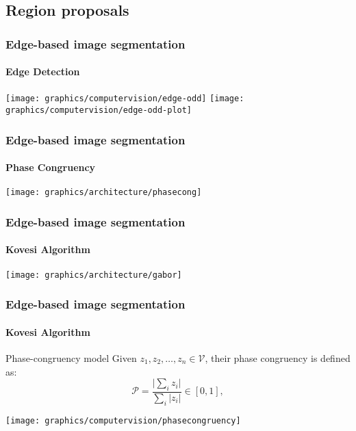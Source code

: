\subsection{Region proposals}
\begin{frame}
    \frametitle{Edge-based image segmentation}
    \framesubtitle{Edge Detection}
    \texttt{[image: graphics/computervision/edge-odd]}
    \texttt{[image: graphics/computervision/edge-odd-plot]}
\end{frame}


\begin{frame}
    \frametitle{Edge-based image segmentation}
    \framesubtitle{Phase Congruency}
    \texttt{[image: graphics/architecture/phasecong]}
\end{frame}

\begin{frame}
    \frametitle{Edge-based image segmentation}
    \framesubtitle{Kovesi Algorithm}
    \texttt{[image: graphics/architecture/gabor]}
\end{frame}
    
\begin{frame}
    \frametitle{Edge-based image segmentation}
    \framesubtitle{Kovesi Algorithm}
    \begin{block}{Phase-congruency model}
        Given $z_1, z_2, \ldots, z_n \in \mathcal{V}$, their phase congruency is defined as:
        \begin{equation*}
            \mathcal{P} = \frac{\lvert\sum_{i} z_{i}\rvert}{\sum_{i} \lvert z_{i} \rvert} \in \left[0,1\right],
        \end{equation*}
    \end{block}
    \centering
    \texttt{[image: graphics/computervision/phasecongruency]}
\end{frame}

